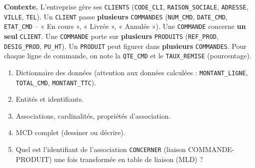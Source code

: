 \documentclass[11pt]{article}
\begin{document}
\begin{exercice}
\textbf{Contexte.} L'entreprise gère ses \texttt{CLIENTS} (\texttt{CODE\_CLI}, \texttt{RAISON\_SOCIALE}, \texttt{ADRESSE}, \texttt{VILLE}, \texttt{TEL}). Un \texttt{CLIENT} passe \textbf{plusieurs} \texttt{COMMANDES} (\texttt{NUM\_CMD}, \texttt{DATE\_CMD}, \texttt{ETAT\_CMD} -- « En cours », « Livrée », « Annulée »). Une \texttt{COMMANDE} concerne \textbf{un seul} \texttt{CLIENT}. Une \texttt{COMMANDE} porte sur \textbf{plusieurs} \texttt{PRODUITS} (\texttt{REF\_PROD}, \texttt{DESIG\_PROD}, \texttt{PU\_HT}). Un \texttt{PRODUIT} peut figurer dans \textbf{plusieurs} \texttt{COMMANDES}. Pour chaque ligne de commande, on note la \texttt{QTE\_CMD} et le \texttt{TAUX\_REMISE} (pourcentage).
\begin{enumerate}
  \item Dictionnaire des données (attention aux données calculées : \texttt{MONTANT\_LIGNE}, \texttt{TOTAL\_CMD}, \texttt{MONTANT\_TTC}).
  \item Entités et identifiants.
  \item Associations, cardinalités, propriétés d'association.
  \item MCD complet (dessiner ou décrire).
  \item Quel est l'identifiant de l'association \texttt{CONCERNER} (liaison COMMANDE-PRODUIT) une fois transformée en table de liaison (MLD) ?
\end{enumerate}
\end{exercice}
\end{document}
